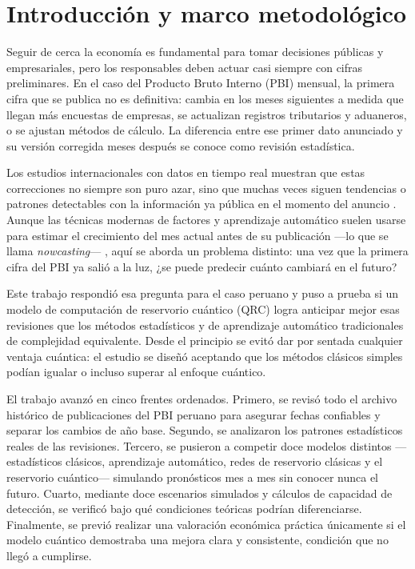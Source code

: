\section{Introducción y marco metodológico}

Seguir de cerca la economía es fundamental para tomar decisiones públicas y empresariales, pero los responsables deben actuar casi siempre con cifras preliminares. En el caso del Producto Bruto Interno (PBI) mensual, la primera cifra que se publica no es definitiva: cambia en los meses siguientes a medida que llegan más encuestas de empresas, se actualizan registros tributarios y aduaneros, o se ajustan métodos de cálculo. La diferencia entre ese primer dato anunciado y su versión corregida meses después se conoce como revisión estadística.

Los estudios internacionales con datos en tiempo real muestran que estas correcciones no siempre son puro azar, sino que muchas veces siguen tendencias o patrones detectables con la información ya pública en el momento del anuncio \parencite{croushore2001,stark2010,croushore2011}. Aunque las técnicas modernas de factores y aprendizaje automático suelen usarse para estimar el crecimiento del mes actual antes de su publicación —lo que se llama \emph{nowcasting}— \parencite{giannone2008,banbura2013}, aquí se aborda un problema distinto: una vez que la primera cifra del PBI ya salió a la luz, ¿se puede predecir cuánto cambiará en el futuro?

Este trabajo respondió esa pregunta para el caso peruano y puso a prueba si un modelo de computación de reservorio cuántico (QRC) logra anticipar mejor esas revisiones que los métodos estadísticos y de aprendizaje automático tradicionales de complejidad equivalente. Desde el principio se evitó dar por sentada cualquier ventaja cuántica: el estudio se diseñó aceptando que los métodos clásicos simples podían igualar o incluso superar al enfoque cuántico.

El trabajo avanzó en cinco frentes ordenados. Primero, se revisó todo el archivo histórico de publicaciones del PBI peruano \parencite{cruz2025} para asegurar fechas confiables y separar los cambios de año base. Segundo, se analizaron los patrones estadísticos reales de las revisiones. Tercero, se pusieron a competir doce modelos distintos —estadísticos clásicos, aprendizaje automático, redes de reservorio clásicas y el reservorio cuántico— simulando pronósticos mes a mes sin conocer nunca el futuro. Cuarto, mediante doce escenarios simulados y cálculos de capacidad de detección, se verificó bajo qué condiciones teóricas podrían diferenciarse. Finalmente, se previó realizar una valoración económica práctica únicamente si el modelo cuántico demostraba una mejora clara y consistente, condición que no llegó a cumplirse.

